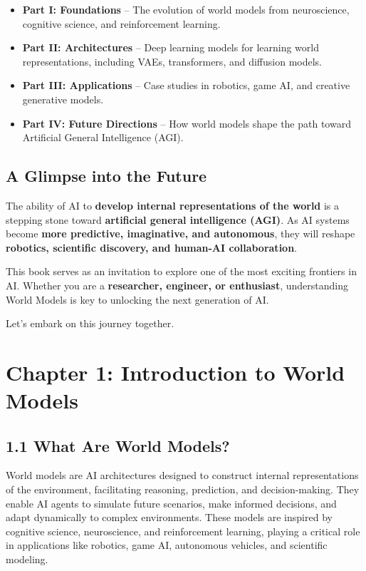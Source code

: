 \documentclass[
]{book}
\providecommand{\tightlist}{%
  \setlength{\itemsep}{0pt}\setlength{\parskip}{0pt}}
\begin{document}
\begin{itemize}
\tightlist
\item
  \textbf{Part I: Foundations} -- The evolution of world models from neuroscience, cognitive science, and reinforcement learning.\\
\item
  \textbf{Part II: Architectures} -- Deep learning models for learning world representations, including VAEs, transformers, and diffusion models.\\
\item
  \textbf{Part III: Applications} -- Case studies in robotics, game AI, and creative generative models.\\
\item
  \textbf{Part IV: Future Directions} -- How world models shape the path toward Artificial General Intelligence (AGI).
\end{itemize}

\section{A Glimpse into the Future}\label{a-glimpse-into-the-future}

The ability of AI to \textbf{develop internal representations of the world} is a stepping stone toward \textbf{artificial general intelligence (AGI)}. As AI systems become \textbf{more predictive, imaginative, and autonomous}, they will reshape \textbf{robotics, scientific discovery, and human-AI collaboration}.

This book serves as an invitation to explore one of the most exciting frontiers in AI. Whether you are a \textbf{researcher, engineer, or enthusiast}, understanding World Models is key to unlocking the next generation of AI.

Let's embark on this journey together.

\chapter{Chapter 1: Introduction to World Models}\label{chapter-1-introduction-to-world-models}

\section{1.1 What Are World Models?}\label{what-are-world-models}

World models are AI architectures designed to construct internal representations of the environment, facilitating reasoning, prediction, and decision-making. They enable AI agents to simulate future scenarios, make informed decisions, and adapt dynamically to complex environments. These models are inspired by cognitive science, neuroscience, and reinforcement learning, playing a critical role in applications like robotics, game AI, autonomous vehicles, and scientific modeling.
\end{document}
